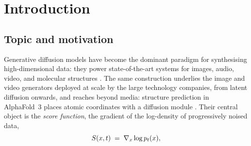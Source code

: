 \chapter{Introduction}\label{ch:intro}

\section{Topic and motivation}

Generative diffusion models have become the dominant paradigm for
synthesising high-dimensional data: they power state-of-the-art systems
for images, audio, video, and molecular structures \citep{sohl2015deep,
ho2020denoising, song2021scorebased, karras2022elucidating}. The same
construction underlies the image and video generators deployed at scale by the
large technology companies, from latent diffusion \citep{rombach2022latent}
onwards, and reaches beyond media: structure prediction in AlphaFold~3 places
atomic coordinates with a diffusion module \citep{abramson2024alphafold3}. Their
central object is the \emph{score function}, the gradient of the
log-density of progressively noised data,
\begin{equation}
  S(x, t) \;=\; \nabla_x \log p_t(x),
  \label{eq:intro-score}
\end{equation}
